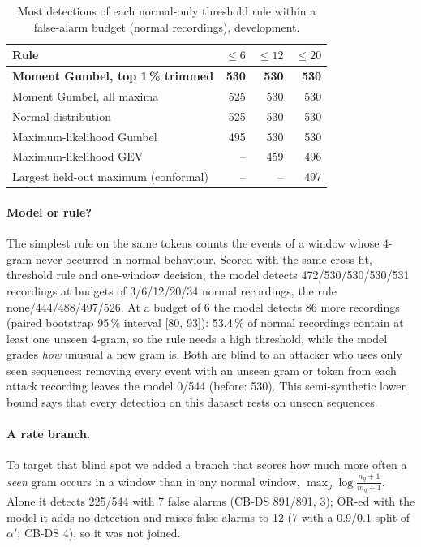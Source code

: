 \begin{table}[t]
\centering\small
\caption{Most detections of each normal-only threshold rule within a false-alarm budget (normal recordings), development.}
\label{tab:thresholds}
\begin{tabular}{@{}lrrr@{}}
\toprule
Rule & $\le 6$ & $\le 12$ & $\le 20$ \\
\midrule
\textbf{Moment Gumbel, top 1\,\% trimmed} & \textbf{530} & \textbf{530} & \textbf{530} \\
Moment Gumbel, all maxima & 525 & 530 & 530 \\
Normal distribution & 525 & 530 & 530 \\
Maximum-likelihood Gumbel & 495 & 530 & 530 \\
Maximum-likelihood GEV & -- & 459 & 496 \\
Largest held-out maximum (conformal) & -- & -- & 497 \\
\bottomrule
\end{tabular}
\end{table}

\paragraph{Model or rule?} The simplest rule on the same tokens counts the events of a window whose 4-gram never
occurred in normal behaviour. Scored with the same cross-fit, threshold rule and one-window decision, the model detects
472/530/530/530/531 recordings at budgets of 3/6/12/20/34 normal recordings, the rule none/444/488/497/526. At a budget
of 6 the model detects 86 more recordings (paired bootstrap 95\,\% interval [80, 93]): 53.4\,\% of normal recordings
contain at least one unseen 4-gram, so the rule needs a high threshold, while the model grades \emph{how} unusual a
new gram is. Both are blind to an attacker who uses only seen sequences: removing every event with an unseen gram or
token from each attack recording leaves the model 0/544 (before: 530). This semi-synthetic lower bound says that every
detection on this dataset rests on unseen sequences.

\paragraph{A rate branch.} To target that blind spot we added a branch that scores how much more often a \emph{seen}
gram occurs in a window than in any normal window, $\max_g \log\frac{n_g+1}{m_g+1}$. Alone it detects 225/544 with 7
false alarms (CB-DS 891/891, 3); OR-ed with the model it adds no detection and raises false alarms to 12 (7 with a
0.9/0.1 split of $\alpha'$; CB-DS 4), so it was not joined.

